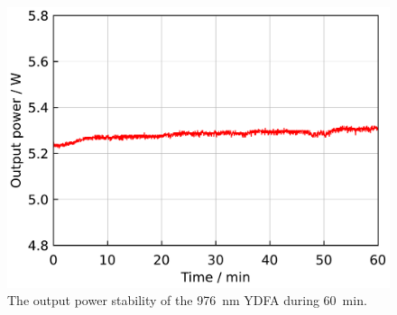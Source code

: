 \documentclass{osa-article}
\begin{document}
\begin{figure}[h!]
  \centering
  \begin{minipage}[b]{0.5\linewidth}
    \centering
    \includegraphics[keepaspectratio, width=0.9\linewidth]{./Figure/DCF-YB-20-128P-FAC172mm_SignalLongTermStability_915Pump70W976Seed0.24W_Exp.pdf}
  \end{minipage}
  \caption{The output power stability of the \SI{976}{\nm} YDFA during \SI{60}{\minute}.}
  \label{fig:LongTermPowerStabilityOfCORACTIVE976YDFA}
\end{figure}
\end{document}
